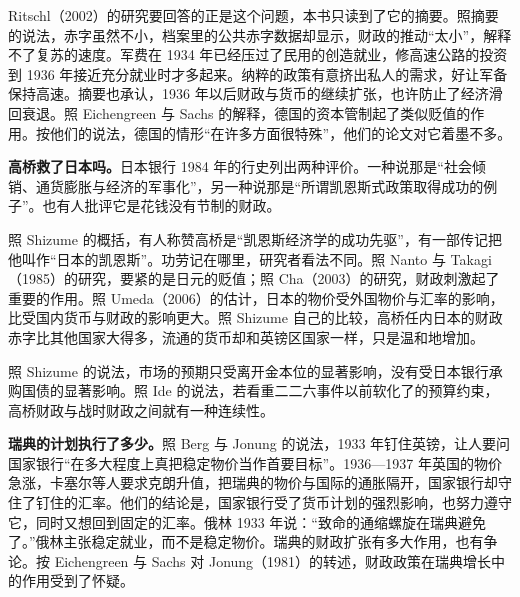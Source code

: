Ritschl（2002）的研究要回答的正是这个问题，本书只读到了它的摘要\cite{ritschl2002}。照摘要的说法，赤字虽然不小，档案里的公共赤字数据却显示，财政的推动“太小”，解释不了复苏的速度\cite{ritschl2002}。军费在 1934 年已经压过了民用的创造就业，修高速公路的投资到 1936 年接近充分就业时才多起来\cite{ritschl2002}。纳粹的政策有意挤出私人的需求，好让军备保持高速\cite{ritschl2002}。摘要也承认，1936 年以后财政与货币的继续扩张，也许防止了经济滑回衰退\cite{ritschl2002}。照 Eichengreen 与 Sachs 的解释，德国的资本管制起了类似贬值的作用\cite{eichengreen1984}。按他们的说法，德国的情形“在许多方面很特殊”，他们的论文对它着墨不多\cite{eichengreen1984}。

\textbf{高桥救了日本吗。}日本银行 1984 年的行史列出两种评价\cite{boj1984}。一种说那是“社会倾销、通货膨胀与经济的军事化”，另一种说那是“所谓凯恩斯式政策取得成功的例子”\cite{boj1984}。也有人批评它是花钱没有节制的财政\cite{boj1984}。

照 Shizume 的概括，有人称赞高桥是“凯恩斯经济学的成功先驱”，有一部传记把他叫作“日本的凯恩斯”\cite{shizume2009}。功劳记在哪里，研究者看法不同。照 Nanto 与 Takagi（1985）的研究，要紧的是日元的贬值；照 Cha（2003）的研究，财政刺激起了重要的作用\cite{shizume2009}。照 Umeda（2006）的估计，日本的物价受外国物价与汇率的影响，比受国内货币与财政的影响更大\cite{shizume2009}。照 Shizume 自己的比较，高桥任内日本的财政赤字比其他国家大得多，流通的货币却和英镑区国家一样，只是温和地增加\cite{shizume2009}。

照 Shizume 的说法，市场的预期只受离开金本位的显著影响，没有受日本银行承购国债的显著影响\cite{shizume2009}。照 Ide 的说法，若看重二二六事件以前软化了的预算约束，高桥财政与战时财政之间就有一种连续性\cite{ide2003}。

\textbf{瑞典的计划执行了多少。}照 Berg 与 Jonung 的说法，1933 年钉住英镑，让人要问国家银行“在多大程度上真把稳定物价当作首要目标”\cite{berg1998}。1936—1937 年英国的物价急涨，卡塞尔等人要求克朗升值，把瑞典的物价与国际的通胀隔开，国家银行却守住了钉住的汇率\cite{berg1998}。他们的结论是，国家银行受了货币计划的强烈影响，也努力遵守它，同时又想回到固定的汇率\cite{berg1998}。俄林 1933 年说：“致命的通缩螺旋在瑞典避免了。”\cite{berg1998}俄林主张稳定就业，而不是稳定物价\cite{berg1998}。瑞典的财政扩张有多大作用，也有争论。按 Eichengreen 与 Sachs 对 Jonung（1981）的转述，财政政策在瑞典增长中的作用受到了怀疑\cite{eichengreen1984}。

